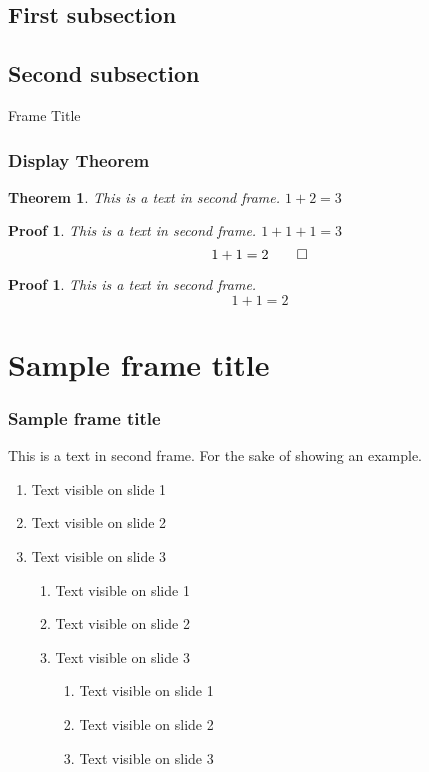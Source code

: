 \documentclass[10pt]{beamer}
\newtheorem{myproofcut}{Proof}[section]
\newtheorem{myproof}{Proof}[section]
\newtheorem{mythm}{Theorem}[section]
\begin{document}

\subsection{First subsection}

\subsection{Second subsection}

\begin{frame}{Frame Title}
    \subsectionpage
\end{frame}

\begin{frame}
  \frametitle{Display Theorem}
  \begin{mythm}
    This is a text in second frame. $1 + 2 = 3$
  \end{mythm}
  \begin{myproof}
    This is a text in second frame. $1 + 1 + 1 = 3$
    \begin{displaymath}
    1 + 1 = 2\qedhere
    \end{displaymath}
  \end{myproof}
  \begin{myproofcut}
    This is a text in second frame. 
    \begin{displaymath}
    1 + 1 = 2
    \end{displaymath}%
  \end{myproofcut}
\end{frame}

\section{Sample frame title}


\begin{frame}
\frametitle{Sample frame title}
This is a text in second frame.
For the sake of showing an example.

\begin{enumerate}
 \itemsep0em
 \item Text visible on slide 1
 \item Text visible on slide 2
 \item Text visible on slide 3
 \begin{enumerate}
 \itemsep0em
 \item Text visible on slide 1
 \item Text visible on slide 2
 \item Text visible on slide 3
 \begin{enumerate}
 \itemsep0em
 \item Text visible on slide 1
 \item Text visible on slide 2
 \item Text visible on slide 3
\end{enumerate}
\end{enumerate}
\end{enumerate}
\end{frame}
\end{document}
